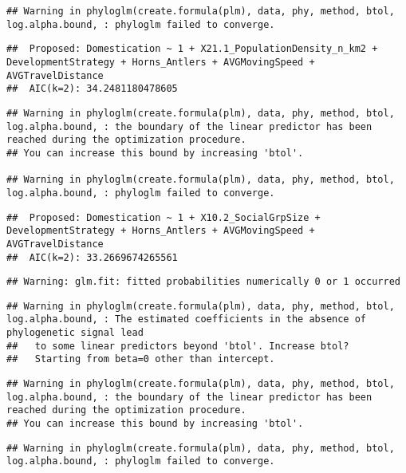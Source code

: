 \documentclass[
]{article}
\begin{document}
\begin{verbatim}
## Warning in phyloglm(create.formula(plm), data, phy, method, btol, log.alpha.bound, : phyloglm failed to converge.
\end{verbatim}

\begin{verbatim}
##  Proposed: Domestication ~ 1 + X21.1_PopulationDensity_n_km2 + DevelopmentStrategy + Horns_Antlers + AVGMovingSpeed + AVGTravelDistance
##  AIC(k=2): 34.2481180478605
\end{verbatim}

\begin{verbatim}
## Warning in phyloglm(create.formula(plm), data, phy, method, btol, log.alpha.bound, : the boundary of the linear predictor has been reached during the optimization procedure.
## You can increase this bound by increasing 'btol'.

## Warning in phyloglm(create.formula(plm), data, phy, method, btol, log.alpha.bound, : phyloglm failed to converge.
\end{verbatim}

\begin{verbatim}
##  Proposed: Domestication ~ 1 + X10.2_SocialGrpSize + DevelopmentStrategy + Horns_Antlers + AVGMovingSpeed + AVGTravelDistance
##  AIC(k=2): 33.2669674265561
\end{verbatim}

\begin{verbatim}
## Warning: glm.fit: fitted probabilities numerically 0 or 1 occurred
\end{verbatim}

\begin{verbatim}
## Warning in phyloglm(create.formula(plm), data, phy, method, btol, log.alpha.bound, : The estimated coefficients in the absence of phylogenetic signal lead
##   to some linear predictors beyond 'btol'. Increase btol?
##   Starting from beta=0 other than intercept.
\end{verbatim}

\begin{verbatim}
## Warning in phyloglm(create.formula(plm), data, phy, method, btol, log.alpha.bound, : the boundary of the linear predictor has been reached during the optimization procedure.
## You can increase this bound by increasing 'btol'.
\end{verbatim}

\begin{verbatim}
## Warning in phyloglm(create.formula(plm), data, phy, method, btol, log.alpha.bound, : phyloglm failed to converge.
\end{verbatim}
\end{document}
